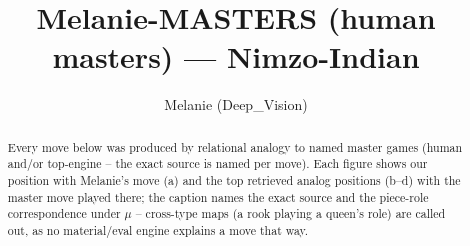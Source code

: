 \documentclass[11pt]{article}
\title{Melanie-MASTERS (human masters) — Nimzo-Indian}
\author{Melanie (Deep\_Vision)}
\date{}
\begin{document}
\maketitle

\begin{abstract}Every move below was produced by relational analogy to named master games (human and/or top-engine -- the exact source is named per move). Each figure shows our position with Melanie's move (a) and the top retrieved analog positions (b--d) with the master move played there; the caption names the exact source and the piece-role correspondence under $\mu$ -- cross-type maps (a rook playing a queen's role) are called out, as no material/eval engine explains a move that way.\end{abstract}

\begin{figure}[p]\centering
\begin{subfigure}{0.46\textwidth}\centering
\resizebox{\linewidth}{!}{%
\newchessgame
\chessboard[
  setfen={rnbq1rk1/pp3ppp/4pn2/2pp4/1bPP4/2NBPN2/PP3PPP/R1BQ1RK1 b - - 1 7},
  showmover=false,
  pgfstyle=straightmove, color=movearrow, markmove={f6-h5}
]}
\caption{}
\end{subfigure}\hfill
\begin{subfigure}{0.46\textwidth}\centering
\resizebox{\linewidth}{!}{%
\newchessgame
\chessboard[
  setfen={r1bq1rk1/pp4pp/2nb1n2/2p1pp2/2PP4/2N1P1PN/P4PBP/R1BQ1RK1 w - - 0 11},
  showmover=false,
  pgfstyle=straightmove, color=movearrow, markmove={c3-b5}
]}
\caption{}
\end{subfigure}
\\[4pt]
\begin{subfigure}{0.46\textwidth}\centering
\resizebox{\linewidth}{!}{%
\newchessgame
\chessboard[
  setfen={rn1qk2r/1bp2pbp/p2pp1p1/4Pn2/P2PNP2/2PB1N2/6PP/R1BQ1RK1 b kq - 0 12},
  showmover=false,
  pgfstyle=straightmove, color=movearrow, markmove={e8-g8}
]}
\caption{}
\end{subfigure}\hfill
\begin{subfigure}{0.46\textwidth}\centering
\resizebox{\linewidth}{!}{%
\newchessgame
\chessboard[
  setfen={rnbr2k1/1p2qppp/4pn2/p1bp4/2P2B2/P1NBPN2/1P2QPPP/R4RK1 b - - 3 11},
  showmover=false,
  pgfstyle=straightmove, color=movearrow, markmove={b8-c6}
]}
\caption{}
\end{subfigure}

\end{figure}
\end{document}
